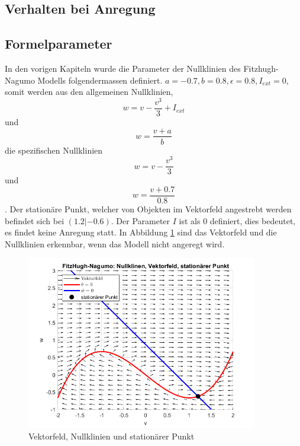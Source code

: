 \begin{refsection}
\section{Verhalten bei Anregung}
\subsection{Formelparameter}
In den vorigen Kapiteln wurde die Parameter der Nullklinien des Fitzhugh-Nagumo Modells folgendermassen definiert.
\(a = -0.7, b = 0.8, \epsilon = 0.8, I_{ext} = 0\), somit werden aus den allgemeinen Nullklinien, \[ w = v - \frac{v^3}{3} + I_{ext}\]
und \[w = \frac{v + a}{b}\] die spezifischen Nullklinien \[ w = v - \frac{v^3}{3}\]
und \[w = \frac{v + 0.7}{0.8}\].
Der stationäre Punkt, welcher von Objekten im Vektorfeld angestrebt werden befindet sich bei $(1.2 |-0.6)$.
Der Parameter $I$ ist als 0 definiert, dies bedeutet, es findet keine Anregung statt.
In Abbildung \ref{fig:Parameter} sind das Vektorfeld und die Nullklinien erkennbar, wenn das Modell nicht angeregt wird.
\begin{figure}[h]
    \centering
    \includegraphics[width=0.9\textwidth]{papers/nerven/Bilder/Anregung1.png}
    \caption{Vektorfeld, Nullklinien und stationärer Punkt}
    \label{fig:Parameter}
\end{figure}
\cite{nerven:InaLammers.31.08.2015}

\end{refsection}
